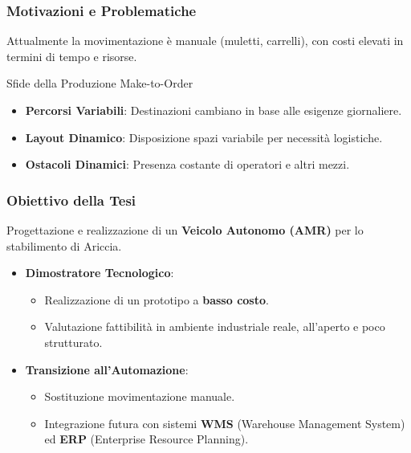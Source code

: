 \begin{frame}
    \frametitle{Motivazioni e Problematiche}
    Attualmente la movimentazione è manuale (muletti, carrelli), con costi elevati in termini di tempo e risorse.
    \vspace{0.5cm}
    \begin{alertblock}{Sfide della Produzione Make-to-Order}
        \begin{itemize}
            \item \textbf{Percorsi Variabili}: Destinazioni cambiano in base alle esigenze giornaliere.
            \item \textbf{Layout Dinamico}: Disposizione spazi variabile per necessità logistiche.
            \item \textbf{Ostacoli Dinamici}: Presenza costante di operatori e altri mezzi.
        \end{itemize}
    \end{alertblock}
\end{frame}

\begin{frame}
    \frametitle{Obiettivo della Tesi}
    Progettazione e realizzazione di un \textbf{Veicolo Autonomo (AMR)} per lo stabilimento di Ariccia.

    \begin{itemize}
        \item \textbf{Dimostratore Tecnologico}:
              \begin{itemize}
                  \item Realizzazione di un prototipo a \textbf{basso costo}.
                  \item Valutazione fattibilità in ambiente industriale reale, all'aperto e poco strutturato.
              \end{itemize}
        \item \textbf{Transizione all'Automazione}:
              \begin{itemize}
                  \item Sostituzione movimentazione manuale.
                  \item Integrazione futura con sistemi \textbf{WMS} (Warehouse Management System) ed \textbf{ERP} (Enterprise Resource Planning).
              \end{itemize}
    \end{itemize}
\end{frame}


